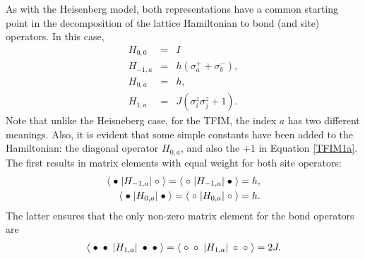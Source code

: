 \documentclass[vecphys]{svmult}
\begin{document}
As with the Heisenberg model, both representations have a common starting point in the decomposition of the lattice Hamiltonian to bond (and site) operators.  In this case, 
\begin{eqnarray}
H_{0,0} &=& I \label {TFIM00} \\
H_{-1,a} &=& h(\sigma^+_a + \sigma^-_b), \label{TFIM-1a} \\
H_{0,a} &=& h, \\
H_{1,a} &=& J (\sigma^z_i \sigma^z_j + 1).  \label{TFIM1a}
\end{eqnarray}
Note that unlike the Heisneberg case, for the TFIM, the index $a$ has two different meanings.  Also, it is evident that some simple constants have been added to the Hamiltonian:  the diagonal operator $H_{0,a}$, and also the $+1$ in Equation \ref{TFIM1a}.  The first results in matrix elements with equal weight for both site operators:
\begin{eqnarray}
\langle \hspace{1mm} \bullet \hspace{1mm}  | H_{-1,a} |\hspace{1mm} \circ \hspace{1mm} \rangle = 
\langle \hspace{1mm} \circ \hspace{1mm}  | H_{-1,a} |\hspace{1mm} \bullet \hspace{1mm} \rangle = h, \label {Tw1} \\
\langle \hspace{1mm}  \bullet \hspace{1mm}  | H_{0,a} | \hspace{1mm} \bullet \hspace{1mm} \rangle = 
\langle \hspace{1mm}  \circ \hspace{1mm}  | H_{0,a} | \hspace{1mm} \circ \hspace{1mm} \rangle = h. \label{Tw2}
\end{eqnarray} 
The latter ensures that the only non-zero matrix element for the bond operators are
\begin{eqnarray}
\langle \hspace{1mm} \bullet \hspace{1mm}  \bullet \hspace{1mm}  | H_{1,a} | \hspace{1mm} \bullet \hspace{1mm} \bullet \hspace{1mm} \rangle = 
\langle \hspace{1mm} \circ \hspace{1mm}  \circ \hspace{1mm}  | H_{1,a} | \hspace{1mm} \circ \hspace{1mm} \circ \hspace{1mm} \rangle = 2J. \label {Tfimdiag} 
\end{eqnarray}
\end{document}
